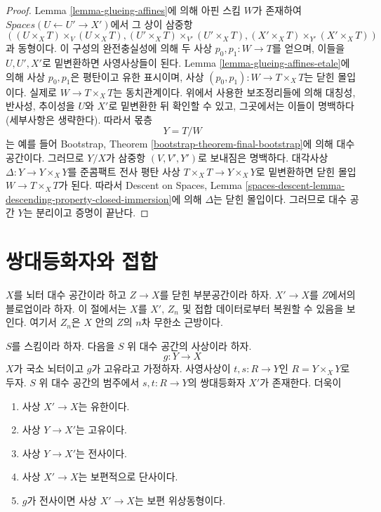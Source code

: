 \begin{proof}
\medskip\noindent
Lemma \ref{lemma-glueing-affines}에 의해 아핀 스킴 $W$가 존재하여
$\textit{Spaces}(U \leftarrow U' \to X')$에서 그 상이 삼중항
$$
((U \times_X T) \times_V (U \times_X T),
(U' \times_X T) \times_{V'} (U' \times_X T),
(X' \times_X T) \times_{Y'} (X' \times_X T))
$$
과 동형이다.
이 구성의 완전충실성에 의해 두 사상 $p_0, p_1 : W \to T$를 얻으며,
이들을 $U, U', X'$로 밑변환하면 사영사상들이 된다. Lemma
\ref{lemma-glueing-affines-etale}에 의해 사상 $p_0, p_1$은 평탄이고
유한 표시이며, 사상 $(p_0, p_1) : W \to T \times_X T$는 닫힌 몰입이다.
실제로 $W \to T \times_X T$는 동치관계이다. 위에서 사용한
보조정리들에 의해 대칭성, 반사성, 추이성을 $U$와 $X'$로 밑변환한 뒤
확인할 수 있고, 그곳에서는 이들이 명백하다(세부사항은 생략한다).
따라서 몫층
$$
Y = T/W
$$
는 예를 들어 Bootstrap, Theorem
\ref{bootstrap-theorem-final-bootstrap}에 의해 대수 공간이다.
그러므로 $Y/X$가 삼중항 $(V, V', Y')$로 보내짐은 명백하다.
대각사상 $\Delta : Y \to Y \times_X Y$를 준콤팩트 전사 평탄 사상
$T \times_X T \to Y \times_X Y$로 밑변환하면 닫힌 몰입
$W \to T \times_X T$가 된다. 따라서 Descent on Spaces, Lemma
\ref{spaces-descent-lemma-descending-property-closed-immersion}에 의해
$\Delta$는 닫힌 몰입이다. 그러므로 대수 공간 $Y$는 분리이고 증명이 끝난다.
\end{proof}

\section{쌍대등화자와 접합}
\label{section-coequalizer-glue}

\noindent
$X$를 뇌터 대수 공간이라 하고 $Z \to X$를 닫힌 부분공간이라 하자.
$X' \to X$를 $Z$에서의 블로업이라 하자. 이 절에서는 $X$를 $X'$,
$Z_n$ 및 접합 데이터로부터 복원할 수 있음을 보인다. 여기서 $Z_n$은
$X$ 안의 $Z$의 $n$차 무한소 근방이다.

\begin{lemma}
\label{lemma-coequalizer}
$S$를 스킴이라 하자. 다음을 $S$ 위 대수 공간의 사상이라 하자.
$$
g : Y \longrightarrow X
$$
$X$가 국소 뇌터이고 $g$가 고유라고 가정하자. 사영사상이
$t, s : R \to Y$인 $R = Y \times_X Y$로 두자. $S$ 위 대수 공간의
범주에서 $s, t : R \to Y$의 쌍대등화자 $X'$가 존재한다. 더욱이
\begin{enumerate}
\item 사상 $X' \to X$는 유한이다.
\item 사상 $Y \to X'$는 고유이다.
\item 사상 $Y \to X'$는 전사이다.
\item 사상 $X' \to X$는 보편적으로 단사이다.
\item $g$가 전사이면 사상 $X' \to X$는 보편 위상동형이다.
\end{enumerate}
\end{lemma}

